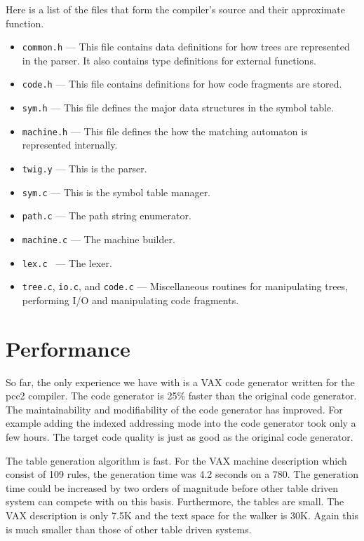 Here is a list of the files that form the \twigcomp{} compiler's source
and their approximate function.
\begin{itemize}
\item {\tt common.h} --- This file contains data definitions for how
trees are represented in the parser.  It also contains type definitions for
external functions.
\item {\tt code.h} --- This file contains definitions for how code fragments
are stored.
\item {\tt sym.h} --- This file defines the major data structures in the
symbol table.
\item {\tt machine.h} ---  This file defines the how the matching automaton
is represented internally.
\item {\tt twig.y} --- This is the parser.
\item {\tt sym.c} ---  This is the symbol table manager.
\item {\tt path.c} --- The path string enumerator.
\item {\tt machine.c} --- The machine builder.
\item {\tt lex.c } --- The lexer.
\item {\tt tree.c}, {\tt io.c}, and {\tt code.c} --- Miscellaneous
routines for manipulating trees, performing I/O and manipulating
code fragments.
\end{itemize}

\section{Performance}

So far, the only experience we have with \twiglang{}
is a VAX code generator written
for the pcc2 compiler.  The \twiglang{} code generator is 25\% faster than
the original code generator.
The maintainability and modifiability of the code generator has
improved.  For example adding the indexed addressing mode
into the code generator took only a few hours.  The target code quality
is just as good as the original code generator.

The \twigcomp{} table
generation algorithm is fast.  For the VAX machine description which
consist of 109 rules, the generation time was 4.2 seconds on a 780.
The generation time could be increased
by two orders of magnitude
before other table driven system can compete with \twigcomp{} on this basis.
Furthermore, the tables are small.  The VAX description is only 7.5K
and the text space for the walker is 30K.
Again this is much smaller than those of other table driven systems.

